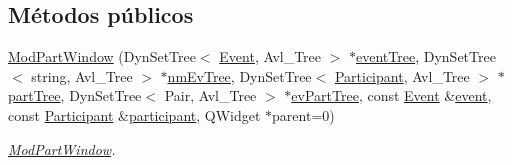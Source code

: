 \subsection*{Métodos públicos}
\begin{DoxyCompactItemize}
\item 
\hyperlink{class_mod_part_window_ad9254849e2cf80f18e1c8d91adef0a07}{Mod\+Part\+Window} (Dyn\+Set\+Tree$<$ \hyperlink{class_event}{Event}, Avl\+\_\+\+Tree $>$ $\ast$\hyperlink{class_mod_part_window_ae6405ca60db3ef03b8e3f8017e379205}{event\+Tree}, Dyn\+Set\+Tree$<$ string, Avl\+\_\+\+Tree $>$ $\ast$\hyperlink{class_mod_part_window_ade9c3877e5f08d16fe3b844f2e860a15}{nm\+Ev\+Tree}, Dyn\+Set\+Tree$<$ \hyperlink{class_participant}{Participant}, Avl\+\_\+\+Tree $>$ $\ast$\hyperlink{class_mod_part_window_a75f2a08aad897cd397a069a7befa6642}{part\+Tree}, Dyn\+Set\+Tree$<$ Pair, Avl\+\_\+\+Tree $>$ $\ast$\hyperlink{class_mod_part_window_a3f8e4260476c300f807ecfe171b6474d}{ev\+Part\+Tree}, const \hyperlink{class_event}{Event} \&\hyperlink{class_mod_part_window_ae4d7721e3272390dddda4e63961c3769}{event}, const \hyperlink{class_participant}{Participant} \&\hyperlink{class_mod_part_window_a4a70ae7bf17facd76bbcbae73cf71c9e}{participant}, Q\+Widget $\ast$parent=0)
\begin{DoxyCompactList}\small\item\em \hyperlink{class_mod_part_window}{Mod\+Part\+Window}. \end{DoxyCompactList}\end{DoxyCompactItemize}
